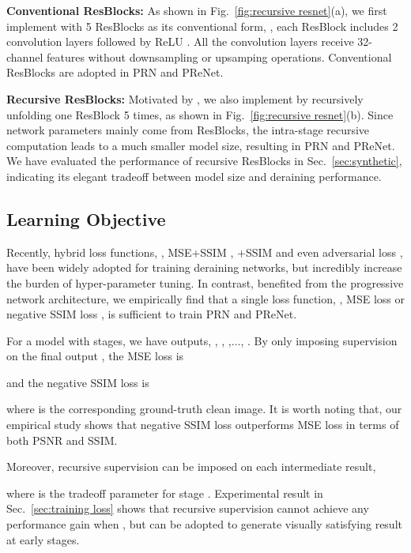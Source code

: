 \documentclass[10pt,twocolumn,letterpaper]{article}
\begin{document}
\noindent \textbf{Conventional ResBlocks:}
As shown in Fig.~\ref{fig:recursive resnet}(a), we first implement  with 5 ResBlocks as its conventional form, \ie, each ResBlock includes 2 convolution layers followed by ReLU \cite{nair2010rectified}.
All the convolution layers receive 32-channel features without downsampling or upsamping operations.
Conventional ResBlocks are adopted in PRN and PReNet.

\vspace{0.03in}
\noindent \textbf{Recursive ResBlocks:}
Motivated by \cite{kim2016deeply,tai2017image}, we also implement  by recursively unfolding one ResBlock 5 times, as shown in Fig.~\ref{fig:recursive resnet}(b).
Since network parameters mainly come from ResBlocks, the intra-stage recursive computation leads to a much smaller model size, resulting in PRN and PReNet.
We have evaluated the performance of recursive ResBlocks in Sec.~\ref{sec:synthetic}, indicating its elegant tradeoff between model size and deraining performance.


\subsection{Learning Objective}
Recently, hybrid loss functions, \eg, MSE+SSIM \cite{fan2018residual}, +SSIM \cite{fu2018lightweight} and even adversarial loss \cite{zhang2017image}, have been widely adopted for training deraining networks, but incredibly increase the burden of hyper-parameter tuning.
In contrast, benefited from the progressive network architecture, we empirically find that a single loss function, \eg, MSE loss or negative SSIM loss \cite{wang2004image}, is sufficient to train PRN and PReNet.


For a model with  stages, we have  outputs, \ie, , ,..., .
By only imposing supervision on the final output , the MSE loss is

and the negative SSIM loss is

where  is the corresponding ground-truth clean image.
It is worth noting that, our empirical study shows that negative SSIM loss outperforms MSE loss in terms of both PSNR and SSIM.



Moreover, recursive supervision can be imposed on each intermediate result,

where  is the tradeoff parameter for stage .
Experimental result in Sec.~\ref{sec:training loss} shows that recursive supervision cannot achieve any performance gain when , but can be adopted to generate visually satisfying result at early stages.
\end{document}
